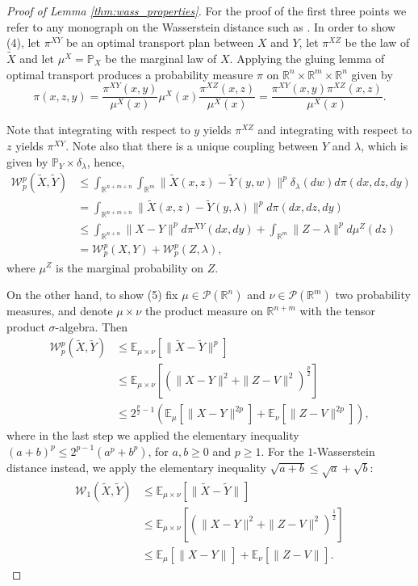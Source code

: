 \documentclass{article}
\theoremstyle{definition}
\theoremstyle{remark}
\numberwithin{equation}{section}
\newcommand{\R}{\mathbb{R}}
\newcommand{\E}{\mathbb{E}}
\newcommand{\norm}[2]{
    \|#1\|_{#2}
}
\begin{document}
\begin{proof}[Proof of Lemma \ref{thm:wass_properties}]
    For the proof of the first three points we refer to any monograph on the Wasserstein distance such as \cite{villani_transport}.
    In order to show (4), let $\pi^{XY}$ be an optimal transport plan between $X$ and $Y$, let $\pi^{XZ}$ be the law of $\tilde X$ and let $\mu^X = \mathbb P_X$ be the marginal law of $X$.
    Applying the gluing lemma of optimal transport produces a probability measure $\pi$ on $\R^n \times \R^m \times \R^n$ given by
    \[
    \pi(x,z,y) = \frac{\pi^{XY}(x,y)}{\mu^X(x)}\mu^X(x)\frac{\pi^{XZ}(x,z)}{\mu^X(x)} = \frac{\pi^{XY}(x,y)\pi^{XZ}(x,z)}{\mu^X(x)}.
    \]

    Note that integrating with respect to $y$ yields $\pi^{XZ}$ and integrating with respect to $z$ yields $\pi^{XY}$. 
    Note also that there is a unique coupling between $Y$ and $\lambda$, which is given by $\mathbb P_Y \times \delta_\lambda$, hence,
    \begin{align}
        \mathcal W_p^p \left(\tilde X, \tilde Y\right) &\le \int_{\R^{n+m+n}} \int_{\R^m} \norm{\tilde X(x,z) - \tilde Y(y,w)}{}^p \delta_\lambda(dw)d\pi(dx,dz,dy) \\
        &= \int_{\R^{n+m+n}} \norm{\tilde X(x,z) - \tilde Y(y,\lambda)}{}^p d\pi(dx,dz,dy) \\
        &\le \int_{\R^{n+n}} \norm{X - Y}{}^p d\pi^{XY}(dx,dy) + \int_{\R^{m}} \norm{Z-\lambda}{}^p d\mu^Z(dz) \\
        &= \mathcal W_p^p\left(X,Y\right) + \mathcal W_p^p\left(Z,\lambda\right),
    \end{align} 
    where $\mu^Z$ is the marginal probability on $Z$.

    On the other hand, to show (5) fix $\mu \in \mathcal P(\R^n)$ and $\nu \in \mathcal P(\R^m)$ two probability measures, and denote $\mu \times \nu$ the product measure on $\R^{n+m}$ with the tensor product $\sigma$-algebra.
    Then
    \begin{align}
        \mathcal W^p_p(\tilde X, \tilde Y) &\le \E_{\mu \times \nu}[\norm{\tilde X - \tilde Y}{}^p] \\
        &\le \E_{\mu \times \nu}[(\norm{X-Y}{}^2 + \norm{Z-V}{}^2)^\frac{p}{2}]\\
        &\le 2^{\frac{p}{2}-1}\left(\E_\mu[\norm{X - Y}{}^{2p}] + \E_\nu[\norm{Z - V}{}^{2p}]\right),
    \end{align}
    where in the last step we applied the elementary inequality $(a+b)^p \le 2^{p-1}(a^p + b^p)$, for $a,b \ge 0$ and $p \ge 1$.
    For the $1$-Wasserstein distance instead, we apply the elementary inequality $\sqrt{a+b} \le \sqrt{a} + \sqrt{b}$:
    \begin{align}
        \mathcal W_1(\tilde X, \tilde Y) &\le \E_{\mu \times \nu}[\norm{\tilde X - \tilde Y}{}] \\
        &\le \E_{\mu \times \nu}[\left(\norm{X-Y}{}^2 + \norm{Z-V}{}^2\right)^\frac{1}{2}]\\
        &\le \E_\mu[\norm{X - Y}{}] + \E_\nu[\norm{Z - V}{}].
    \end{align}
    

\end{proof}
\end{document}

